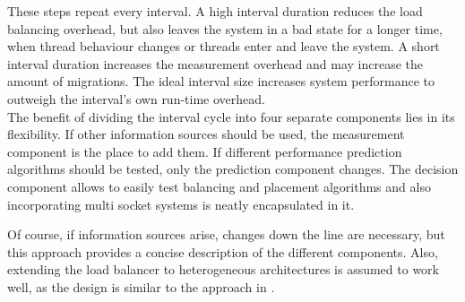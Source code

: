 These steps repeat every interval. A high interval duration reduces the
load balancing overhead, but also leaves the system in a bad state for a longer
time, when thread behaviour changes or threads enter and leave the system.
A short interval duration increases the measurement overhead and may increase
the amount of migrations.
The ideal interval size increases system performance to outweigh the interval's
own run-time overhead.
\\

The benefit of dividing the interval cycle into four separate components lies
in its flexibility.
If other information sources should be used, the measurement component is the
place to add them.
If different performance prediction algorithms should be tested, only the
prediction component changes.
The decision component allows to easily test balancing and placement algorithms
and also incorporating multi socket systems is neatly encapsulated in it.

Of course, if information sources arise, changes down the line are necessary,
but this approach provides a concise description of the different components.
Also, extending the load balancer to heterogeneous architectures is assumed to
work well, as the design is similar to the approach in
\cite{sarma_smartbalance_2015}.


\begin{comment}

\paragraph{Topology description}
Represents the cache and core layout of the CPU.
On Haswell it consist of a package description containing core descriptions.
A core description consists of the hardware assigned APIC\_id, the kernel
assigned fiasco\_id, and the SMT abstraction.
It can be expanded to include multi-socket systems by adding more package
descriptions.
It maps the fiasco view on the cores onto the actual HW topology and uses CPUID
to determine corresponding logical cores.

\paragraph{Thread\_t}
is the administrative representation of a L4-thread.
It contains not only of the thread parameters passed via run\_thread(), but
also measurements for the current and last interval.
LLC-misses, execution time, an identifier, and the cores it currently runs on
and will run on in the next interval.

\end{comment}
